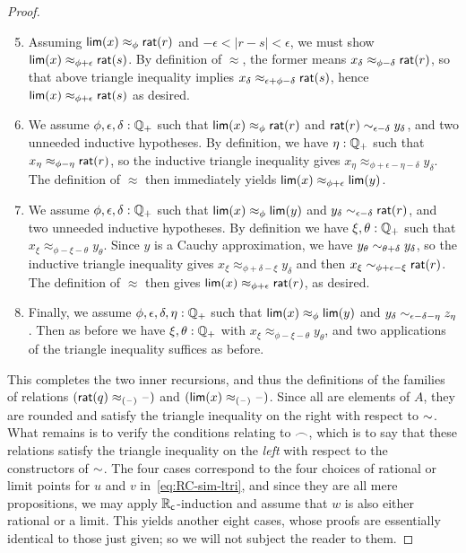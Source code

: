 \begin{proof}
  \begin{enumerate}\setcounter{enumi}{4}
  \item Assuming $\mathsf{lim}(x)\approx_\phi \mathsf{rat}(r)$ and $-\epsilon<|r-s|<\epsilon$, we must show $\mathsf{lim}(x)\approx_{\phi+\epsilon} \mathsf{rat}(s)$.
    By definition of $\approx$, the former means $x_\delta \approx_{\phi-\delta} \mathsf{rat}(r)$, so that above triangle inequality implies $x_\delta \approx_{\epsilon+\phi-\delta} \mathsf{rat}(s)$, hence $\mathsf{lim}(x)\approx_{\phi+\epsilon} \mathsf{rat}(s)$ as desired.
  \item We assume $\phi,\epsilon,\delta:\mathbb{Q}_{+}$ such that $\mathsf{lim}(x)\approx_\phi \mathsf{rat}(r)$ and $\mathsf{rat}(r) \sim_{\epsilon-\delta} y_\delta$, and two unneeded inductive hypotheses.
    By definition, we have $\eta:\mathbb{Q}_{+}$ such that $x_\eta \approx_{\phi-\eta} \mathsf{rat}(r)$, so the inductive triangle inequality gives $x_\eta \approx_{\phi+\epsilon-\eta-\delta} y_\delta$.
    The definition of $\approx$ then immediately yields $\mathsf{lim}(x) \approx_{\phi+\epsilon} \mathsf{lim}(y)$.
  \item We assume $\phi,\epsilon,\delta:\mathbb{Q}_{+}$ such that $\mathsf{lim}(x)\approx_\phi \mathsf{lim}(y)$ and $y_\delta \sim_{\epsilon-\delta} \mathsf{rat}(r)$, and two unneeded inductive hypotheses.
    By definition we have $\xi,\theta:\mathbb{Q}_{+}$ such that $x_\xi \approx_{\phi-\xi-\theta} y_\theta$.
    Since $y$ is a Cauchy approximation, we have $y_\theta \sim_{\theta+\delta} y_\delta$, so the inductive triangle inequality gives $x_\xi \approx_{\phi+\delta-\xi} y_\delta$ and then $x_\xi \sim_{\phi+\epsilon-\xi} \mathsf{rat}(r)$.
    The definition of $\approx$ then gives $\mathsf{lim}(x) \approx_{\phi+\epsilon}\mathsf{rat}(r)$, as desired.
  \item Finally, we assume $\phi,\epsilon,\delta,\eta:\mathbb{Q}_{+}$ such that $\mathsf{lim}(x)\approx_\phi \mathsf{lim}(y)$ and $y_\delta \sim_{\epsilon-\delta-\eta} z_\eta$.
    Then as before we have $\xi,\theta:\mathbb{Q}_{+}$ with $x_\xi \approx_{\phi-\xi-\theta} y_\theta$, and two applications of the triangle inequality suffices as before.
  \end{enumerate}

  This completes the two inner recursions, and thus the definitions of the families of relations $(\mathsf{rat}(q)\approx_{(\mathord{\hspace{1pt}\text{--}\hspace{1pt}})}\mathord{\hspace{1pt}\text{--}\hspace{1pt}})$ and $(\mathsf{lim}(x)\approx_{(\mathord{\hspace{1pt}\text{--}\hspace{1pt}})}\mathord{\hspace{1pt}\text{--}\hspace{1pt}})$.
  Since all are elements of $A$, they are rounded and satisfy the triangle inequality on the right with respect to $\mathord\sim$.
  What remains is to verify the conditions relating to $\frown$, which is to say that these relations satisfy the triangle inequality on the \emph{left} with respect to the constructors of $\mathord\sim$.
  The four cases correspond to the four choices of rational or limit points for $u$ and $v$ in~\eqref{eq:RC-sim-ltri}, and since they are all mere propositions, we may apply $\mathbb{R}_\mathsf{c}$-induction and assume that $w$ is also either rational or a limit.
  This yields another eight cases, whose proofs are essentially identical to those just given; so we will not subject the reader to them.
\end{proof}

